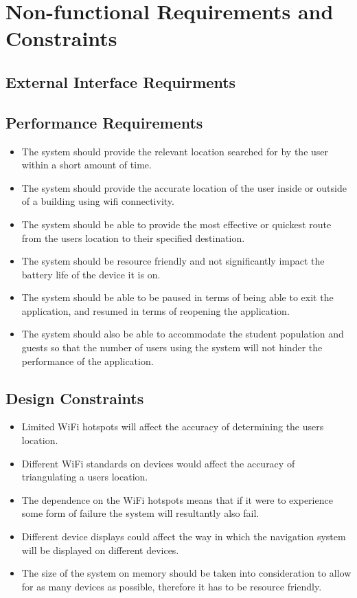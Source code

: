 \documentclass{article}
\begin{document}
		
		\clearpage
		
	\section{Non-functional Requirements and Constraints}\label{sec: non-functional-requirments}
	
		\subsection{External Interface Requirments}\label{sec:external-inteface-requirments}
		
		\subsection{Performance Requirements}\label{sec:performance-requirements}
			\begin{itemize}
			\small
			\item The system should provide the relevant location searched for by the user within a short amount of time.
			\item The system should provide the accurate location of the user inside or outside of a building using wifi connectivity.
			\item The system should be able to provide the most effective or quickest route from the users location to their specified destination.
			\item The system should be resource friendly and not significantly impact the battery life of the device it is on.
			\item The system should be able to be paused in terms of being able to exit the application, and resumed in terms of reopening the application.
			\item The system should also be able to accommodate the student population and guests so that the number of users using the system will not hinder the performance of the application.
			\end{itemize}
		

		\subsection{Design Constraints}\label{sec:design-constraints}
			\begin{itemize}
			\small
			\item Limited WiFi hotspots will affect the accuracy of determining the users location.
			\item Different WiFi standards on devices would affect the accuracy of triangulating a users location.
			\item The dependence on the WiFi hotspots means that if it were to experience some form of failure the system will resultantly also fail.
			\item Different device displays could affect the way in which the navigation system will be displayed on different devices.
			\item The size of the system on memory should be taken into consideration to allow for as many devices as possible, therefore it has to be resource friendly.
			\end{itemize}
		
\end{document}
